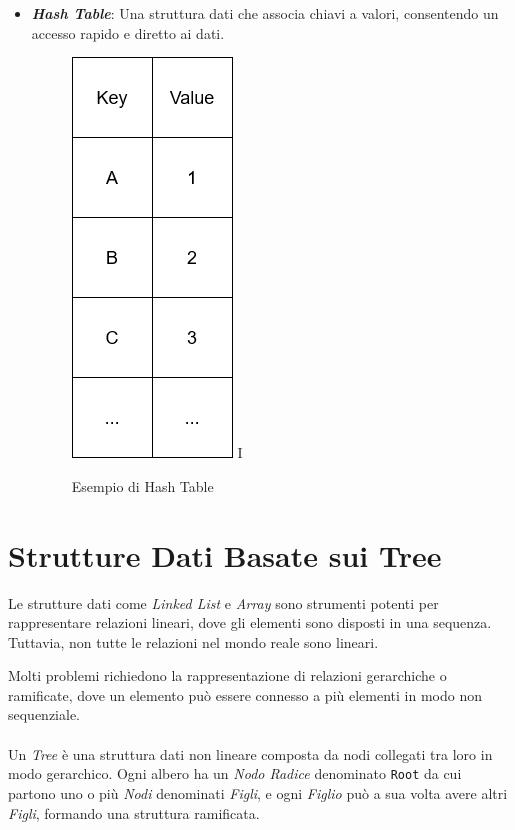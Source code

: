\documentclass[12pt,a4paper,openright,twoside]{book}
\begin{document}
\begin{itemize}
            \item \textit{\textbf{Hash Table}}: Una struttura dati che associa chiavi a valori, consentendo un accesso rapido e diretto ai dati.
            \begin{figure} [h]
                \centering
                \includegraphics[width=.15\linewidth]{figures/HashTable.png}
I               \caption{Esempio di Hash Table}
                \label{fig:hash-table}
            \end{figure}
        \end{itemize}

        \cite{cormen2022introduction}

    \section{Strutture Dati Basate sui Tree}

        Le strutture dati come \textit{Linked List} e \textit{Array} sono strumenti potenti per rappresentare relazioni lineari, dove gli elementi sono disposti in una sequenza. Tuttavia, non tutte le relazioni nel mondo reale sono lineari.

        Molti problemi richiedono la rappresentazione di relazioni gerarchiche o ramificate, dove un elemento può essere connesso a più elementi in modo non sequenziale.

        \paragraph*{}

        Un \textit{Tree} è una struttura dati non lineare composta da nodi collegati tra loro in modo gerarchico. Ogni albero ha un \textit{Nodo Radice} denominato \texttt{Root} da cui partono uno o più \textit{Nodi} denominati \textit{Figli}, e ogni \textit{Figlio} può a sua volta avere altri \textit{Figli}, formando una struttura ramificata.

        \paragraph*{}
\end{document}
